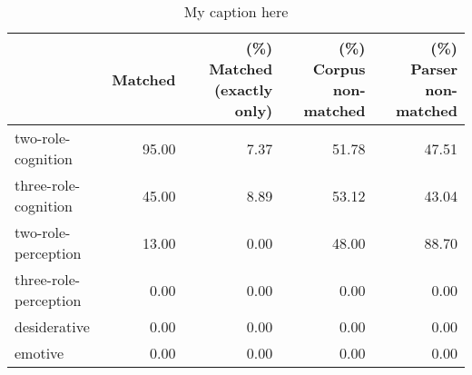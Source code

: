 \begin{table}[!ht]
\centering
\begin{tabular}{lrrrr}
\toprule
{} &  Matched &  (\%) Matched (exactly only) &  (\%) Corpus non-matched &  (\%) Parser non-matched \\
\midrule
two-role-cognition    &    95.00 &                        7.37 &                   51.78 &                   47.51 \\
three-role-cognition  &    45.00 &                        8.89 &                   53.12 &                   43.04 \\
two-role-perception   &    13.00 &                        0.00 &                   48.00 &                   88.70 \\
three-role-perception &     0.00 &                        0.00 &                    0.00 &                    0.00 \\
desiderative          &     0.00 &                        0.00 &                    0.00 &                    0.00 \\
emotive               &     0.00 &                        0.00 &                    0.00 &                    0.00 \\
\bottomrule
\end{tabular}
\caption{My caption here}
\label{tab:MENTAL-oe-relative}
\end{table}